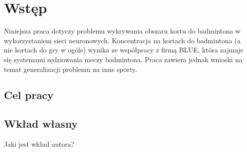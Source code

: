 \chapter{Wstęp}

Niniejsza praca dotyczy problemu wykrywania obszaru kortu do badmintona w wykorzystaniem sieci neuronowych.
Koncentracja na kortach do badmintona (a nie kortach do gry w ogóle) wynika ze współpracy z firmą BLUE, która zajmuje się systemami sędziowania meczy badmintona. Praca zawiera jednak wnioski na temat generalizacji problemu na inne sporty.

\section{Cel pracy}

\section{Wkład własny}

Jaki jest wkład autora?
